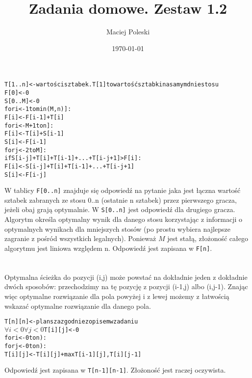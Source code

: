 \documentclass[a4paper,12pt]{article}
\title{Zadania domowe. Zestaw 1.2}
\author{Maciej Poleski}
\date{\today}
\begin{document}
\maketitle

\newpage

\section{}

\section{}
\begin{alltt}
 T[1..n] <- wartości sztabek. T[1] to wartość sztabki na samym dnie stosu
 F[0] <- 0
 S[0..M] <- 0
 for i <- 1 to min(M,n)]:
    F[i] <- F[i-1]+T[i]
 for i <- M+1 to n]:
    F[i] <- T[i] + S[i-1]
    S[i] <- F[i-1]
    for j <- 2 to M]:
        if S[i-j] + T[i] + T[i-1] + ... + T[i-j+1] > F[i]:
            F[i] <- S[i-j] + T[i] + T[i-1] + ... + T[i-j+1]
            S[i] <- F[i-j]
\end{alltt}
 W tablicy \verb|F[0..n]| znajduje się odpowiedź na pytanie jaka jest łączna wartość sztabek zabranych ze stosu 0..n (ostatnie n sztabek) przez pierwszego gracza, jeżeli obaj grają optymalnie. W \verb|S[0..n]| jest odpowiedź dla drugiego gracza. Algorytm określa optymalny wynik dla danego stosu korzystając z informacji o optymalnych wynikach dla mniejszych stosów (po prostu wybiera najlepsze zagranie z pośród wszystkich legalnych). Ponieważ $M$ jest stałą, złożoność całego algorytmu jest liniowa względem n. Odpowiedź jest zapisana w \verb|F[n]|.
\section{}
Optymalna ścieżka do pozycji (i,j) może powstać na dokładnie jeden z dokładnie dwóch sposobów: przechodzimy na tę pozycję z pozycji (i-1,j) albo (i,j-1). Znając więc optymalne rozwiązanie dla pola powyżej i z lewej możemy z łatwością wskazać optymalne rozwiązanie dla danego pola.
\begin{alltt}
T[n][n] <- plansza zgodnie z opisem w zadaniu
\(\forall{i<0} \forall{j<0}\) T[i][j] <- 0
for i <- 0 to n):
    for j <- 0 to n):
        T[i][j] <- T[i][j] + max{T[i-1][j],T[i][j-1]}

\end{alltt}
Odpowiedź jest zapisana w \verb|T[n-1][n-1]|. Złożoność jest raczej oczywista.
\end{document}

